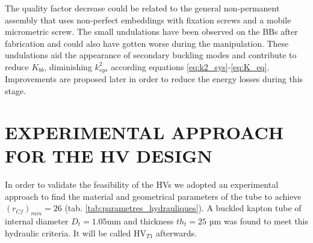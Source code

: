 \documentclass[3p,twocolumn,preprint]{elsarticle}
\begin{document}
The quality factor decrease could be related to the general non-permanent assembly that uses non-perfect embeddings with fixation screws and a mobile micrometric screw. The small undulations have been observed on the BBs after fabrication and could also have gotten worse during the manipulation. These undulations aid the appearance of secondary buckling modes and contribute to reduce $K_{bb}$, diminishing $k^2_{sys}$ according equations \ref{eq:k2_sys}-\ref{eq:K_eq}. Improvements are proposed later in order to reduce the energy losses during this stage.

\section{EXPERIMENTAL APPROACH FOR THE HV \mbox{DESIGN}}
\label{sec:EXPERIMENTAL APPROACH FOR THE HV DESIGN}
In order to validate the feasibility of the HVs we adopted an experimental approach to find the material and geometrical parameters of the tube to achieve $(r_{Cf})_{min}=26$ (tab. \ref{tab:parametres_hydrauliques}). A buckled kapton tube \cite{Dupont2012} of internal diameter $D_t=1.05$mm and thickness $th_t=25$ µm was found to meet this hydraulic criteria. It will be called HV$_{T1}$ afterwards. 
\end{document}
